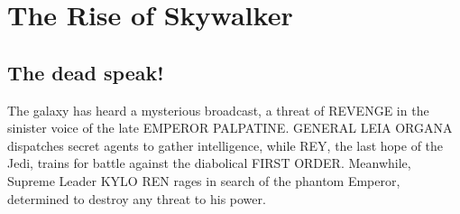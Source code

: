 \documentclass[oneside]{ifgw}
\begin{document}
\lipsum[1-10]



\chapter{The Rise of Skywalker}
\section{The dead speak!}
The galaxy has heard a mysterious broadcast, a threat of REVENGE in the sinister voice of the late EMPEROR PALPATINE. GENERAL LEIA ORGANA dispatches secret agents to gather intelligence, while REY, the last hope of the Jedi, trains for battle against the diabolical FIRST ORDER. Meanwhile, Supreme Leader KYLO REN rages in search of the phantom Emperor, determined to destroy any threat to his power.

\lipsum[1-20]

\cite{CHAUDHURI_2014,MATSUI_1986,MROWCZYNSKI_1998}
\cite{THEWS_2001}
\cite{EICHTEN_1980}
\cite{CHAUDHURI_2014}
\cite{MROWCZYNSKI_1998}
\cite{BJORKEN_1983}
\cite{THEWS_2001}
\cite{MATSUI_1986}
\cite{RAGHUNATH_2018}
\cite{VOGT_2007}
\cite{FLORKOWSKI_2010}
\cite{GROSS_1973}
\cite{POLITZER_1973}
\cite{BARTKE_2009}
\cite{EICHTEN_1980e}






\end{document}
